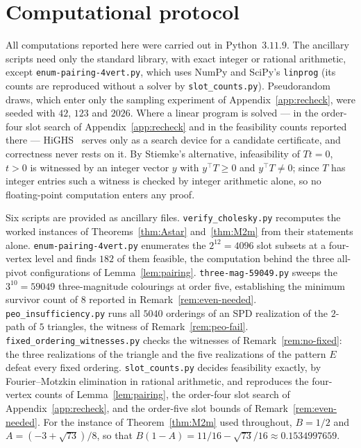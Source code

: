 \documentclass[11pt]{article}
\theoremstyle{plain}
\theoremstyle{definition}
\theoremstyle{remark}
\begin{document}
\section{Computational protocol}\label{app:protocol}
\begin{humanblock}
All computations reported here were carried out in Python~$3.11.9$. The ancillary scripts need only
the standard library, with exact integer or rational arithmetic, except \texttt{enum-pairing-4vert.py},
which uses NumPy and SciPy's \texttt{linprog} (its counts are reproduced without a solver by
\texttt{slot\_counts.py}). Pseudorandom draws, which enter only the sampling
experiment of Appendix~\ref{app:recheck}, were seeded with $42$, $123$ and $2026$. Where a linear program is solved --- in the order-four slot search of
Appendix~\ref{app:recheck} and in the feasibility counts reported there --- HiGHS~\cite{HiGHS} serves
only as a search device for a candidate certificate, and correctness never rests on it. By Stiemke's
alternative, infeasibility of $Tt=0$, $t>0$ is witnessed by an integer vector $y$ with
$y^\top T\ge0$ and $y^\top T\neq0$; since $T$ has integer entries such a witness is checked by integer
arithmetic alone, so no floating-point computation enters any proof.

Six scripts are provided as ancillary files. \texttt{verify\_cholesky.py} recomputes the worked
instances of Theorems~\ref{thm:Astar} and~\ref{thm:M2m} from their statements alone.
\texttt{enum-pairing-4vert.py} enumerates the $2^{12}=4096$ slot subsets at a four-vertex level and
finds $182$ of them feasible, the computation behind the three all-pivot configurations of
Lemma~\ref{lem:pairing}. \texttt{three-mag-59049.py} sweeps the $3^{10}=59049$ three-magnitude
colourings at order five, establishing the minimum survivor count of $8$ reported in
Remark~\ref{rem:even-needed}. \texttt{peo\_insufficiency.py} runs all $5040$ orderings of an SPD
realization of the $2$-path of $5$ triangles, the witness of Remark~\ref{rem:peo-fail}.
\texttt{fixed\_ordering\_witnesses.py} checks the witnesses of Remark~\ref{rem:no-fixed}: the three
realizations of the triangle and the five realizations of the pattern $E$ defeat every fixed
ordering. \texttt{slot\_counts.py} decides feasibility exactly, by Fourier--Motzkin elimination in
rational arithmetic, and reproduces the four-vertex counts of Lemma~\ref{lem:pairing}, the order-four
slot search of Appendix~\ref{app:recheck}, and the order-five slot bounds of
Remark~\ref{rem:even-needed}. For the
instance of Theorem~\ref{thm:M2m} used throughout, $B=1/2$ and
$A=(-3+\sqrt{73})/8$, so that $B(1-A)=11/16-\sqrt{73}/16\approx0.1534997659$.
\end{humanblock}
\end{document}
